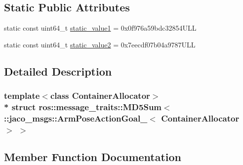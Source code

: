\subsection*{Static Public Attributes}
\begin{DoxyCompactItemize}
\item 
static const uint64\+\_\+t \hyperlink{structros_1_1message__traits_1_1MD5Sum_3_01_1_1jaco__msgs_1_1ArmPoseActionGoal___3_01ContainerAllocator_01_4_01_4_a807b590f4b1c7c32d7dbfdb6cae4a44e}{static\+\_\+value1} = 0x0f976a59bdc32854\+U\+LL
\item 
static const uint64\+\_\+t \hyperlink{structros_1_1message__traits_1_1MD5Sum_3_01_1_1jaco__msgs_1_1ArmPoseActionGoal___3_01ContainerAllocator_01_4_01_4_aae8b430e78771f822c7695b3554c95d1}{static\+\_\+value2} = 0x7eecdf07b04a9787\+U\+LL
\end{DoxyCompactItemize}


\subsection{Detailed Description}
\subsubsection*{template$<$class Container\+Allocator$>$\\*
struct ros\+::message\+\_\+traits\+::\+M\+D5\+Sum$<$ \+::jaco\+\_\+msgs\+::\+Arm\+Pose\+Action\+Goal\+\_\+$<$ Container\+Allocator $>$ $>$}



\subsection{Member Function Documentation}
